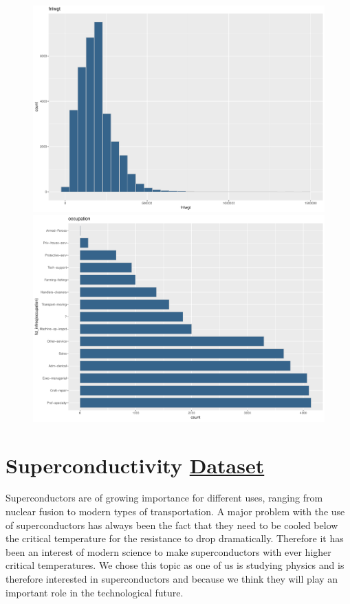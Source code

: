 \documentclass{scrartcl}[a4paper, 11pt]
\begin{document}
\begin{figure}[H]
\begin{minipage}[b]{0.45\linewidth}
            \includegraphics[width=\textwidth]{figures/fnlwgt.pdf} 
        \end{minipage}
        \begin{minipage}[b]{0.45\linewidth}
            \centering
            \includegraphics[width=\textwidth]{figures/occupation.pdf} 
        \end{minipage} 
    \end{figure}
    
\section{Superconductivity \href{https://archive.ics.uci.edu/dataset/464/superconductivty+data}{Dataset}}

Superconductors are of growing importance for different uses, ranging from nuclear fusion to modern types of transportation. A major problem with the use of superconductors has always been the fact that they need to be cooled below the critical temperature for the resistance to drop dramatically. Therefore it has been an interest of modern science to make superconductors with ever higher critical temperatures. We chose this topic as one of us is studying physics and is therefore interested in superconductors and because we think they will play an important role in the technological future.
\vspace{4mm}
\end{document}
